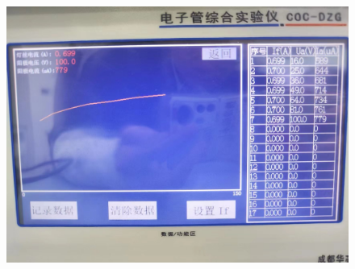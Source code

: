 \documentclass[UTF8]{article}
\begin{document}
\begin{appendix}
\begin{figure}[H]
            	\includegraphics[clip,scale=0.2,trim={0 0 0 0}]{fig/fig20.jpg}
            	\label{figure.15}
\end{figure}


\end{appendix}
\end{document}
